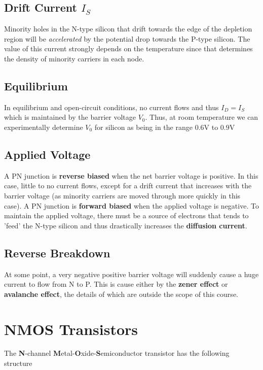 \documentclass[11pt]{report}
\begin{document}
\subsection*{Drift Current $I_S$}
Minority holes in the N-type silicon that drift towards the edge of the depletion region will be \textit{accelerated} by the potential drop towards the P-type silicon. The value of this current strongly depends on the temperature since that determines the density of minority carriers in each node.

\subsection*{Equilibrium}
In equilibrium and open-circuit conditions, no current flows and thus $I_D = I_S$ which is maintained by the barrier voltage $V_0$. Thus, at room temperature we can experimentally determine $V_0$ for silicon as being in the range $0.6$V to $0.9$V

\subsection*{Applied Voltage}
A PN junction is \textbf{reverse biased} when the net barrier voltage is positive. In this case, little to no current flows, except for a drift current that increases with the barrier voltage (as minority carriers are moved through more quickly in this case). A PN junction is \textbf{forward biased} when the applied voltage is negative. To maintain the applied voltage, there must be a source of electrons that tends to 'feed' the N-type silicon and thus drastically increases the \textbf{diffusion current}.

\subsection*{Reverse Breakdown}
 At some point, a very negative positive barrier voltage will suddenly cause a huge current to flow from N to P. This is cause either by the \textbf{zener effect} or \textbf{avalanche effect}, the details of which are outside the scope of this course.


 \section{NMOS Transistors}

 The \textbf{N}-channel \textbf{M}etal-\textbf{O}xide-\textbf{S}emiconductor transistor has the following structure
\end{document}
